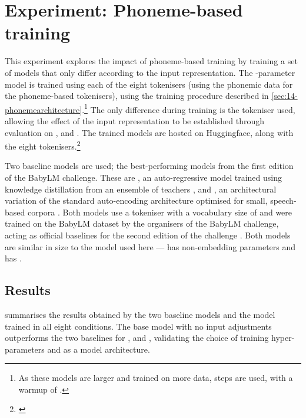 \section{Experiment: Phoneme-based training}\label{sec:14-phonemepretraining}

This experiment explores the impact of phoneme-based training by training a set of models that only differ according to the input representation. The -parameter \gpt model is trained using each of the eight tokenisers (using the phonemic data for the phoneme-based tokenisers), using the training procedure described in \cref{sec:14-phonemearchitecture}.\footnote{As these models are larger and trained on more data,  steps are used, with a warmup of .} The only difference during training is the tokeniser used, allowing the effect of the input representation to be established through evaluation on \blimp, \glue and \babyslm. The trained models are hosted on Huggingface, along with the eight tokenisers.\footnote{\href{https://huggingface.co/collections/phonemetransformers/from-babble-to-words-66e068b54765a48ff30273c9}{}}

Two baseline models are used; the best-performing models from the first edition of the BabyLM challenge. These are , an auto-regressive model trained using knowledge distillation from an ensemble of teachers \citep{timiryasov-tastet-2023-baby}, and , an architectural variation of the standard auto-encoding \bert architecture optimised for small, speech-based corpora \citep{samuel-etal-2023-trained, charpentier-samuel-2023-layers}. Both models use a \bpe tokeniser with a vocabulary size of  and were trained on the BabyLM dataset by the organisers of the BabyLM challenge, acting as official baselines for the second edition of the challenge \citep{hu-etal-2024-findings}. Both models are similar in size to the \gpt model used here ---  has  non-embedding parameters and  has .

\subsection{Results}

 summarises the results obtained by the two baseline models and the \gpt model trained in all eight conditions. %
The base \gpt model with no input adjustments outperforms the two baselines for \blimp, \blimpsupp and \glue, validating the choice of training hyper-parameters and \gpt as a model architecture.

